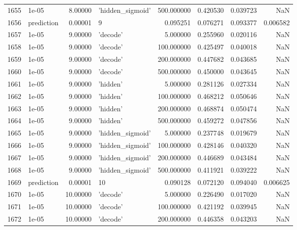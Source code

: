 \documentclass[10pt,a4paper]{article}
\begin{document}
\begin{tabular}{llrlrrrr}
1655 &       1e-05 &   8.00000 &   'hidden\_sigmoid' &  500.000000 &  0.420530 &  0.039723 &       NaN \\
1656 &  prediction &   0.00001 &                  9 &    0.095251 &  0.076271 &  0.093377 &  0.006582 \\
1657 &       1e-05 &   9.00000 &           'decode' &    5.000000 &  0.255960 &  0.020116 &       NaN \\
1658 &       1e-05 &   9.00000 &           'decode' &  100.000000 &  0.425497 &  0.040018 &       NaN \\
1659 &       1e-05 &   9.00000 &           'decode' &  200.000000 &  0.447682 &  0.043685 &       NaN \\
1660 &       1e-05 &   9.00000 &           'decode' &  500.000000 &  0.450000 &  0.043645 &       NaN \\
1661 &       1e-05 &   9.00000 &           'hidden' &    5.000000 &  0.281126 &  0.027334 &       NaN \\
1662 &       1e-05 &   9.00000 &           'hidden' &  100.000000 &  0.468212 &  0.050646 &       NaN \\
1663 &       1e-05 &   9.00000 &           'hidden' &  200.000000 &  0.468874 &  0.050474 &       NaN \\
1664 &       1e-05 &   9.00000 &           'hidden' &  500.000000 &  0.459272 &  0.047856 &       NaN \\
1665 &       1e-05 &   9.00000 &   'hidden\_sigmoid' &    5.000000 &  0.237748 &  0.019679 &       NaN \\
1666 &       1e-05 &   9.00000 &   'hidden\_sigmoid' &  100.000000 &  0.428146 &  0.040320 &       NaN \\
1667 &       1e-05 &   9.00000 &   'hidden\_sigmoid' &  200.000000 &  0.446689 &  0.043484 &       NaN \\
1668 &       1e-05 &   9.00000 &   'hidden\_sigmoid' &  500.000000 &  0.411921 &  0.039222 &       NaN \\
1669 &  prediction &   0.00001 &                 10 &    0.090128 &  0.072120 &  0.094040 &  0.006625 \\
1670 &       1e-05 &  10.00000 &           'decode' &    5.000000 &  0.226490 &  0.017020 &       NaN \\
1671 &       1e-05 &  10.00000 &           'decode' &  100.000000 &  0.421192 &  0.039945 &       NaN \\
1672 &       1e-05 &  10.00000 &           'decode' &  200.000000 &  0.446358 &  0.043203 &       NaN \\

\end{tabular}
\end{document}
